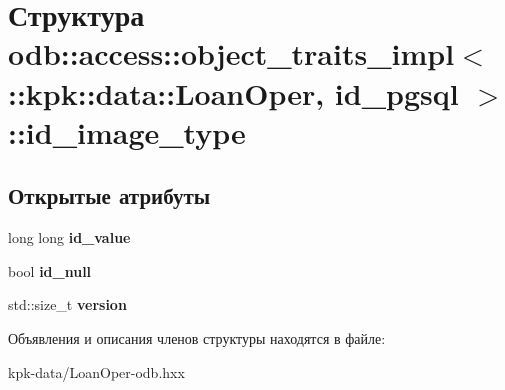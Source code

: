 \hypertarget{structodb_1_1access_1_1object__traits__impl_3_01_1_1kpk_1_1data_1_1_loan_oper_00_01id__pgsql_01_4_1_1id__image__type}{}\section{Структура odb\+:\+:access\+:\+:object\+\_\+traits\+\_\+impl$<$ \+:\+:kpk\+:\+:data\+:\+:Loan\+Oper, id\+\_\+pgsql $>$\+:\+:id\+\_\+image\+\_\+type}
\label{structodb_1_1access_1_1object__traits__impl_3_01_1_1kpk_1_1data_1_1_loan_oper_00_01id__pgsql_01_4_1_1id__image__type}
\subsection*{Открытые атрибуты}
\begin{DoxyCompactItemize}
\item 
long long {\bfseries id\+\_\+value}\hypertarget{structodb_1_1access_1_1object__traits__impl_3_01_1_1kpk_1_1data_1_1_loan_oper_00_01id__pgsql_01_4_1_1id__image__type_adf189f8ba9a928d0f7659519a9f7e61f}{}\label{structodb_1_1access_1_1object__traits__impl_3_01_1_1kpk_1_1data_1_1_loan_oper_00_01id__pgsql_01_4_1_1id__image__type_adf189f8ba9a928d0f7659519a9f7e61f}

\item 
bool {\bfseries id\+\_\+null}\hypertarget{structodb_1_1access_1_1object__traits__impl_3_01_1_1kpk_1_1data_1_1_loan_oper_00_01id__pgsql_01_4_1_1id__image__type_abe307e8c1bdb4663bff5125251b08863}{}\label{structodb_1_1access_1_1object__traits__impl_3_01_1_1kpk_1_1data_1_1_loan_oper_00_01id__pgsql_01_4_1_1id__image__type_abe307e8c1bdb4663bff5125251b08863}

\item 
std\+::size\+\_\+t {\bfseries version}\hypertarget{structodb_1_1access_1_1object__traits__impl_3_01_1_1kpk_1_1data_1_1_loan_oper_00_01id__pgsql_01_4_1_1id__image__type_a1a15b14d8d9a027c3b32025a6aec56af}{}\label{structodb_1_1access_1_1object__traits__impl_3_01_1_1kpk_1_1data_1_1_loan_oper_00_01id__pgsql_01_4_1_1id__image__type_a1a15b14d8d9a027c3b32025a6aec56af}

\end{DoxyCompactItemize}


Объявления и описания членов структуры находятся в файле\+:\begin{DoxyCompactItemize}
\item 
kpk-\/data/Loan\+Oper-\/odb.\+hxx\end{DoxyCompactItemize}
